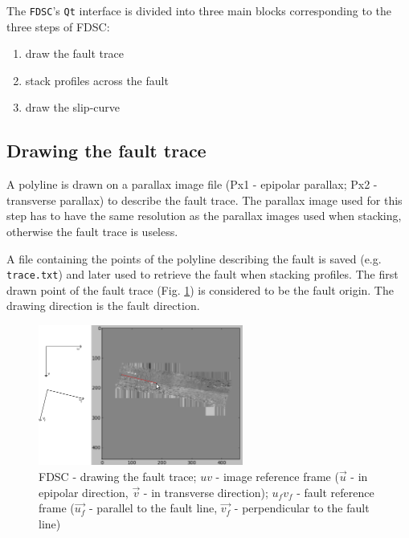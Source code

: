 The \verb+FDSC+'s \verb+Qt+ interface is divided into three main blocks corresponding to the three steps of FDSC:
\begin{enumerate}
  \item draw the fault trace
  \item stack profiles across the fault
  \item draw the slip-curve
\end{enumerate}


\subsection{Drawing the fault trace}

A polyline is drawn on a parallax image file (Px1 - epipolar parallax; Px2 - transverse parallax) to describe the fault trace. The parallax image used for this step has to have the same resolution as the parallax images used when stacking, otherwise the fault trace is useless.

A file containing the points of the polyline describing the fault is saved (e.g. \verb+trace.txt+) and later used to retrieve the fault when stacking profiles.
The first drawn point of the fault trace (Fig. \ref{FIG:fdsc_traceFaultK_withFrames}) is considered to be the fault origin. The drawing direction is the fault direction. %

\begin{figure}
  \begin{center}
    \includegraphics[width=0.6\textwidth]{FIGS/Fdsc/fdsc_traceFaultK_withFrames.png}
  \end{center}
  \caption{FDSC - drawing the fault trace; $uv$ - image reference frame ($\vec{u}$ - in epipolar direction, $\vec{v}$ - in transverse direction); $u_fv_f$ - fault reference frame ($\vec{u_f}$ - parallel to the fault line, $\vec{v_f}$ - perpendicular to the fault line)}
  \label{FIG:fdsc_traceFaultK_withFrames}
\end{figure}

